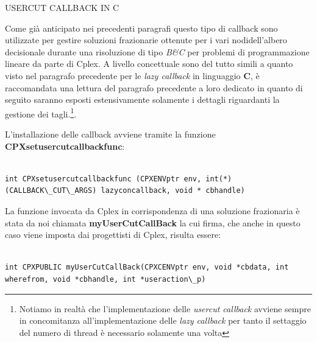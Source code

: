\documentclass[11pt]{article}
\begin{document}
\vspace{2\baselineskip}
USERCUT CALLBACK IN C
\vspace{2\baselineskip}

Come già anticipato nei precedenti paragrafi questo tipo di callback sono utilizzate per gestire soluzioni frazionarie ottenute per i vari nodidell'albero decisionale durante una risoluzione di tipo \textit{B\&C} per problemi di programmazione lineare da parte di Cplex. A livello concettuale sono del tutto simili a quanto visto nel paragrafo precedente per le \textit{lazy callback} in linguaggio \textbf{C}, è raccomandata una lettura del paragrafo precedente a loro dedicato in quanto di seguito saranno esposti estensivamente solamente i dettagli riguardanti la gestione dei tagli.\footnote{Notiamo in realtà che l'implementazione delle \textit{usercut callback} avviene sempre in concomitanza all'implementazione delle \textit{lazy callback} per tanto il settaggio del numero di thread è necessario solamente una volta}.

L'installazione delle callback avviene tramite la funzione \textbf{CPXsetusercutcallbackfunc}:

\begin{lstlisting}

int CPXsetusercutcallbackfunc (CPXENVptr env, int(*)(CALLBACK\_CUT\_ARGS) lazyconcallback, void * cbhandle)

\end{lstlisting}

La funzione invocata da Cplex in corrispondenza di una soluzione frazionaria è stata da noi chiamata \textbf{myUserCutCallBack} la cui firma, che anche in questo caso viene imposta dai progettisti di Cplex, risulta essere:

\begin{lstlisting}

int CPXPUBLIC myUserCutCallBack(CPXCENVptr env, void *cbdata, int wherefrom, void *cbhandle, int *useraction\_p)

\end{lstlisting}
\end{document}
